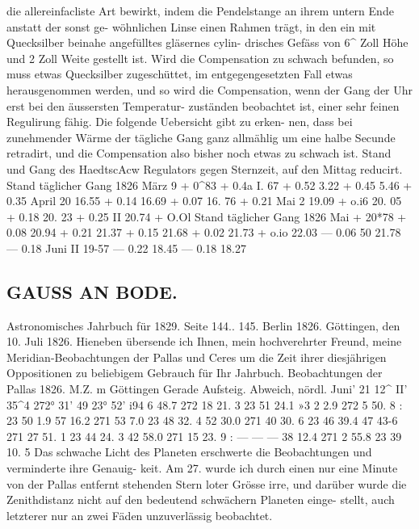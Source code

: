 \documentclass[10pt,a4paper]{article}
\begin{document}
die  allereinfacliste  Art  bewirkt,  indem  die  Pendelstange  an  ihrem  untern  Ende  anstatt  der  sonst  ge-
wöhnlichen Linse  einen  Rahmen  trägt,  in  den  ein  mit  Quecksilber  beinahe  angefülltes  gläsernes  cylin-
drisches  Gefäss  von  6\textasciicircum{}  Zoll  Höhe  und  2  Zoll  Weite  gestellt  ist.  Wird  die  Compensation  zu  schwach
befunden,  so  muss  etwas  Quecksilber  zugeschüttet,  im  entgegengesetzten  Fall  etwas  herausgenommen
werden,  und  so  wird  die  Compensation,  wenn  der  Gang  der  Uhr  erst  bei  den  äussersten  Temperatur-
zuständen beobachtet  ist,  einer  sehr  feinen  Regulirung  fähig.  Die  folgende  Uebersicht  gibt  zu  erken-
nen, dass  bei  zunehmender  Wärme  der  tägliche  Gang  ganz  allmählig  um  eine  halbe  Secunde  retradirt,
und  die  Compensation  also  bisher  noch  etwas  zu  schwach  ist.
Stand  und  Gang  des  HaedtscAcw  Regulators  gegen  Sternzeit,  auf  den  Mittag  reducirt.
Stand
täglicher  Gang
1826  März    9
+   0\textasciicircum{}83
+  0.4a
I.  67
+  0.52
3.22
+  0.45
5.46
+  0.35
April  20
16.55
+  0.14
16.69
+  0.07
16.  76
+  0.21
Mai       2
19.09
+  o.i6
20.  05
+  0.18
20.  23
+  0.25
II
20.74
+  O.Ol
Stand
täglicher  Gang
1826  Mai
+  20*78
+  0.08
20.94
+  0.21
21.37
+  0.15
21.68
+  0.02
21.73
+  o.io
22.03
---  0.06
\textbullet{}50
21.78
---  0.18
Juni
II
19-57
---  0.22
18.45
---  0.18
18.27
\subsection*{GAUSS  AN  BODE.}

Astronomisches  Jahrbuch  für  1829.     Seite  144..  145.     Berlin  1826.
Göttingen,  den  10.  Juli  1826.
Hieneben  übersende  ich  Ihnen,   mein  hochverehrter  Freund,   meine  Meridian-Beobachtungen  der
Pallas  und  Ceres  um  die  Zeit  ihrer  diesjährigen  Oppositionen  zu  beliebigem  Gebrauch  für  Ihr  Jahrbuch.
Beobachtungen  der  Pallas  1826.
M.Z. m  Göttingen Gerade  Aufsteig.
Abweich,  nördl.
Juni'  21
12\textasciicircum{}
II'\glqq{}  35\textasciicircum{}4
272°  31'     4\glqq{}9
23°  52'    i9\glqq{}4
6     48.7
272     18     21. 3
23     51     24.1
»3
2       2.9
272       5     50. 8  :
23     50      1.9
57     16.2
271     53       7.0
23     48     32. 4
52     30.0
271     40     30. 6
23     46     39.4
47     43-6
271     27     51. 1
23     44     24. 3
42     58.0
271     15     23. 9 :
---    ---      ---
38     12.4
271       2     55.8
23     39     10. 5
Das  schwache  Licht  des  Planeten  erschwerte  die  Beobachtungen  und  verminderte  ihre  Genauig-
keit. Am  27.  wurde  ich  durch  einen  nur  eine  Minute  von  der  Pallas  entfernt  stehenden  Stern  loter
Grösse  irre,  und  darüber  wurde  die  Zenithdistanz  nicht  auf  den  bedeutend  schwächern  Planeten  einge-
stellt, auch  letzterer  nur  an  zwei  Fäden  unzuverlässig  beobachtet.
\end{document}
